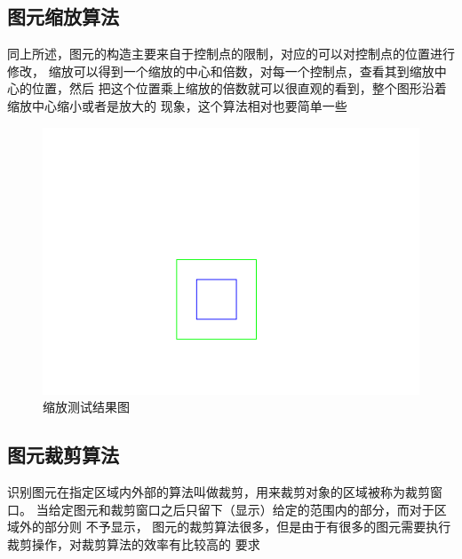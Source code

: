 \documentclass[a4paper,UTF8]{article}
\theoremstyle{definition}
\begin{document}
\subsection{图元缩放算法}
同上所述，图元的构造主要来自于控制点的限制，对应的可以对控制点的位置进行修改，
缩放可以得到一个缩放的中心和倍数，对每一个控制点，查看其到缩放中心的位置，然后
把这个位置乘上缩放的倍数就可以很直观的看到，整个图形沿着缩放中心缩小或者是放大的
现象，这个算法相对也要简单一些

\begin{figure}[ht]
	\centering
	\includegraphics[scale=0.5]{figure/scale.png}
	\caption{缩放测试结果图}
	\label{fig:scale-alg}
\end{figure}

\subsection{图元裁剪算法}
识别图元在指定区域内外部的算法叫做裁剪，用来裁剪对象的区域被称为裁剪窗口。
当给定图元和裁剪窗口之后只留下（显示）给定的范围内的部分，而对于区域外的部分则
不予显示，
图元的裁剪算法很多，但是由于有很多的图元需要执行裁剪操作，对裁剪算法的效率有比较高的
要求
\end{document}
